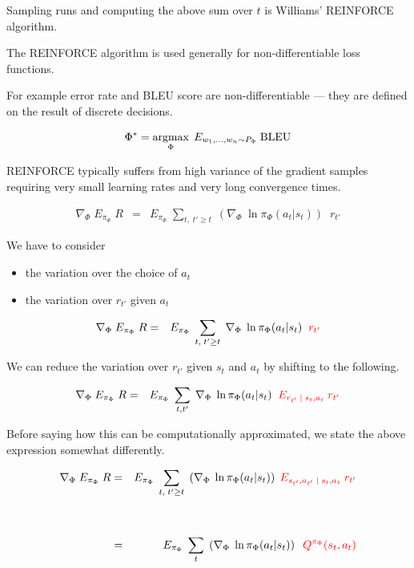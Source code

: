 {\vfill
Sampling runs and computing the above sum over $t$ is Williams' REINFORCE algorithm.


The REINFORCE algorithm is used generally for non-differentiable loss functions.

\vfill
For example error rate and BLEU score are non-differentiable --- they are defined on the result of discrete decisions.

\vfill
$$\Phi^* = \operatorname*{argmax}_\Phi \;E_{w_1,\ldots,w_n \sim P_\Phi}\;\mathrm{BLEU}$$


REINFORCE typically suffers from high variance of the gradient samples requiring very small learning rates and very long convergence times.

\begin{eqnarray*}
    \nabla_\Phi \; E_{\pi_\Phi}\; R  & = & E_{\pi_\Phi}\; \sum_{t,\;t'\geq t}\; \left(\nabla_\Phi\;\ln \pi_\Phi(a_{t}|s_{t})\right)\;\;r_{t'}
\end{eqnarray*}

\vfill
We have to consider
\begin{itemize}
\item {\color{red} the variation over the choice of $a_t$}
\item {\color{red} the variation over $r_{t'}$ given $a_t$}
\end{itemize}



\begin{eqnarray*}
    \nabla_\Phi \; E_{\pi_\Phi}\; R  & = & E_{\pi_\Phi}\; \sum_{t,\;t'\geq t}\; \nabla_\Phi\;\ln \pi_\Phi(a_{t}|s_{t})\;\;{\color{red} r_{t'}}
\end{eqnarray*}

\vfill
We can reduce the variation over $r_{t'}$ given $s_t$ and $a_t$ by shifting to the following.

\begin{eqnarray*}
    \nabla_\Phi \; E_{\pi_\Phi}\; R  & = & E_{\pi_\Phi}\; \sum_{t,t'}\;\nabla_\Phi\; \ln \pi_\Phi(a_{t}|s_{t})\;\;{\color{red} E_{r_{t'}\;|\;s_t,a_t}\;r_{t'}}
\end{eqnarray*}

Before saying how this can be computationally approximated, we state the above expression somewhat differently.

\begin{eqnarray*}
  \nabla_\Phi \;E_{\pi_\Phi}\;R & = & E_{\pi_\Phi}\; \sum_{t,\;t' \geq t} \; \left(\nabla_\Phi\;\ln \pi_\Phi(a_t|s_t)\right) \;{\color{red} E_{s_{t'},a_{t'}\;|\;s_t,a_t}\;r_{t'}} \\
  \\
  \\
  & = & E_{\pi_\Phi} \; \sum_t\; \left(\nabla_\Phi \;\ln \pi_\Phi(a_t|s_t)\right) \;\;{\color{red} Q^{\pi_\Phi}(s_t,a_t)}
\end{eqnarray*}

}
